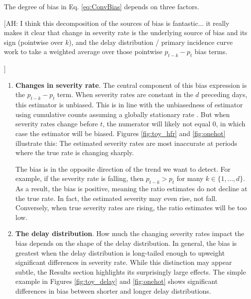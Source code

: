 \documentclass{article}
\newcommand{\ahcomment}[1]{{\color{teal}[AH: #1]}}
\begin{document}
The degree of bias in Eq. \ref{eq:ConvBias} depends on three factors.
\ahcomment{
  I think this decomposition of the sources of bias is fantastic... it really
  makes it clear that change in severity rate is the underlying source of
  bias and its sign (pointwise over $k$),
  and the delay distribution / primary incidence curve work to take a weighted
  average over those pointwise $p_{t-k}-p_t$ bias terms.

}
\begin{enumerate}
    \item \textbf{Changes in severity rate}. The central component of this bias expression is the $p_{t-k}-p_t$ term. When severity rates are constant in the $d$ preceding days, this estimator is unbiased. This is in line with the unbiasedness of estimator using cumulative counts assuming a globally stationary rate \cite{nishiura}. But when severity rates change before $t$, the numerator will likely not equal 0, in which case the estimator will be biased. Figures \ref{fig:toy_hfr} and \ref{fig:onehot} illustrate this: The estimated severity rates are most inaccurate at periods where the true rate is changing sharply. 

The bias is in the opposite direction of the trend we want to detect. For example, if the severity rate is falling, then $p_{t-k} > p_t$ for many $k\in \{1, \ldots, d\}$. As a result, the bias is positive, meaning the ratio estimates do not decline at the true rate. In fact, the estimated severity may even rise, not fall. Conversely, when true severity rates are rising, the ratio estimates will be too low. %

    \item \textbf{The delay distribution}. How much the changing severity rates impact the bias depends on the shape of the delay distribution. In general, the bias is greatest when the delay distribution is long-tailed enough to upweight significant differences in severity rate. While this distinction may appear subtle, the Results section highlights its surprisingly large effects. The simple example in Figures \ref{fig:toy_delay} and \ref{fig:onehot} shows significant differences in bias between shorter and longer delay distributions. 



\end{enumerate}
\end{document}
